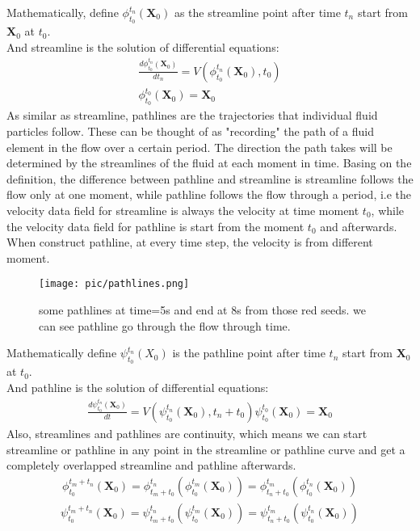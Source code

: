 \documentclass[
     11pt,         %
     a4paper,      %
     oneside,
     ]{article}
\newcommand{\vect}[1]{\boldsymbol{#1}}
\begin{document}
	Mathematically, define $\phi_{t_{0}}^{t_{n}}(\vect{X}_{0})$ as the streamline point after time $t_{n}$ start from  $\vect{X}_{0}$ at $t_{0}$. \\
	And streamline is the solution of differential equations:\\
	\begin{eqnarray}
	\frac{d\phi_{t_{0}}^{t_{n}}(\vect{X}_{0})}{dt_{n}}=V(\phi_{t_{0}}^{t_{n}}(\vect{X}_{0}),t_{0})\\
	\phi_{t_{0}}^{t_{0}}(\vect{X}_{0})=\vect{X}_{0}
	\end{eqnarray}
	As similar as streamline, pathlines are the trajectories that individual fluid particles follow. These can be thought of as "recording" the path of a fluid element in the flow over a certain period. The direction the path takes will be determined by the streamlines of the fluid at each moment in time\cite{PathlineDefine}. Basing on the definition, the difference between pathline and streamline is streamline follows the flow only at one moment, while pathline follows the  flow  through a period, i.e the velocity data field for streamline is always the velocity at time moment $t_{0}$, while the velocity data field for pathline is start from the moment $t_{0}$ and afterwards. When construct pathline, at every time step, the velocity is from different moment.\\
		\begin{figure}[H]
			\centering
			\texttt{[image: pic/pathlines.png]}
			\caption{{\tiny some pathlines at time=5s and end at 8s from those red seeds. we can see pathline go through the flow through time.}}
			\label{fig:pathlineatfrom5s}
		\end{figure}
	Mathematically define $\psi_{t_{0}}^{t_{n}}(X_{0})$ is the pathline point after time $t_{n}$ start from $\vect{X}_{0}$ at $t_{0}$.\\
	And pathline is the solution of differential equations:\\
	\begin{eqnarray}
		\frac{d\psi_{t_{0}}^{t_{n}}(\vect{X}_{0})}{dt}=V(\psi_{t_{0}}^{t_{n}}(\vect{X}_{0}),t_{n}+t_{0})
		\psi_{t_{0}}^{t_{0}}(\vect{X}_{0})=\vect{X}_{0}
	\end{eqnarray}
	Also, streamlines and pathlines are continuity, which means we can start streamline or pathline in any point in the streamline or pathline curve and get a completely overlapped streamline and pathline afterwards.  
	\begin{eqnarray}
	\phi_{t_{0}}^{t_{m}+t_{n}}(\vect{X}_{0})=\phi_{t_{m}+t_{0}}^{t_{n}}(\phi_{t_{0}}^{t_{m}}(\vect{X}_{0}))=\phi_{t_{n}+t_{0}}^{t_{m}}(\phi_{t_{0}}^{t_{n}}(\vect{X}_{0}))
	\end{eqnarray}
	\begin{eqnarray}
	\psi_{t_{0}}^{t_{m}+t_{n}}(\vect{X}_{0})=\psi_{t_{m}+t_{0}}^{t_{n}}(\psi_{t_{0}}^{t_{m}}(\vect{X}_{0}))=\psi_{t_{n}+t_{0}}^{t_{m}}(\psi_{t_{0}}^{t_{n}}(\vect{X}_{0}))
	\end{eqnarray}
\end{document}
